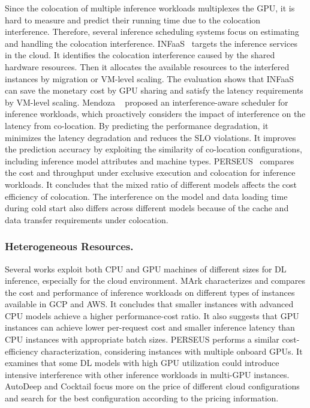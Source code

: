 Since the colocation of multiple inference workloads multiplexes the GPU, it is hard to measure and predict their running time due to the colocation interference.
Therefore, several inference scheduling systems focus on estimating and handling the colocation interference. INFaaS~\cite{Neeraja2019INFaaSw,INFaaS} targets the inference services in the cloud. It identifies the colocation interference caused by the shared hardware resources.
Then it allocates the available resources to the interfered instances by migration or VM-level scaling. The evaluation shows that INFaaS can save the monetary cost by GPU sharing and satisfy the latency requirements by VM-level scaling. Mendoza \etal~\cite{Interference-Aware21} proposed an interference-aware scheduler for inference workloads, which proactively considers the impact of interference on the latency from co-location. By predicting the performance degradation, it minimizes the latency degradation and reduces the SLO violations. It improves the prediction accuracy by exploiting the similarity of co-location configurations, including inference model attributes and machine types. PERSEUS~\cite{lemay2020Perseus} compares the cost and throughput under exclusive execution and colocation for inference workloads. It concludes that the mixed ratio of different models affects the cost efficiency of colocation. The interference on the model and data loading time during cold start also differs across different models because of the cache and data transfer requirements under colocation.






\subsubsection{Heterogeneous Resources.}
Several works exploit both CPU and GPU machines of different sizes for DL inference, especially for the cloud environment. MArk \cite{zhang2019mark,zhang2020mark} characterizes and compares the cost and performance of inference workloads on different types of instances available in GCP and AWS. It concludes that smaller instances with advanced CPU models achieve a higher performance-cost ratio. It also suggests that GPU instances can achieve lower per-request cost and smaller inference latency than CPU instances with appropriate batch sizes. PERSEUS \cite{lemay2020Perseus} performs a similar cost-efficiency characterization, considering instances with multiple onboard GPUs. It examines that some DL models with high GPU utilization could introduce intensive interference with other inference workloads in multi-GPU instances. AutoDeep \cite{AutoDeep} and Cocktail \cite{Jashwant2021Cocktail} focus more on the price of different cloud configurations and search for the best configuration according to the pricing information.






